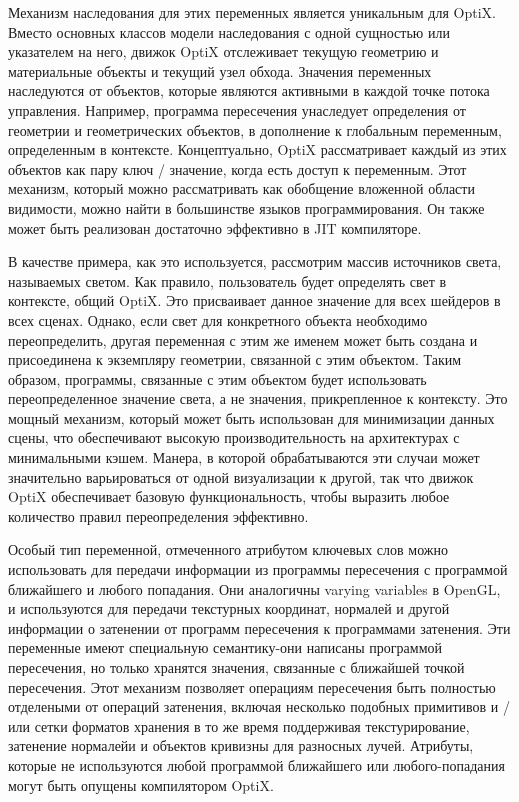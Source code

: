 Механизм наследования для этих переменных является уникальным для OptiX.
Вместо основных классов модели наследования с одной сущностью или указателем на него, движок OptiX отслеживает текущую геометрию и материальные объекты и текущий узел обхода.
Значения переменных наследуются от объектов, которые являются активными в каждой точке потока управления.
Например, программа пересечения унаследует определения от геометрии и геометрических объектов, в дополнение к глобальным переменным, определенным в контексте.
Концептуально, OptiX рассматривает каждый из этих объектов как пару ключ / значение, когда есть доступ к переменным.
Этот механизм, который можно рассматривать как обобщение вложенной области видимости, можно найти в большинстве языков программирования. Он также может быть реализован достаточно эффективно в JIT компиляторе.

В качестве примера, как это используется, рассмотрим массив источников света, называемых светом.
Как правило, пользователь будет определять свет в контексте, общий OptiX.
Это присваивает данное значение для всех шейдеров в всех сценах.
Однако, если свет для конкретного объекта необходимо переопределить, другая переменная с этим же именем может быть создана и присоединена к экземпляру геометрии, связанной с этим объектом.
Таким образом, программы, связанные с этим объектом будет использовать переопределенное значение света, а не значения, прикрепленное к контексту.
Это мощный механизм, который может быть использован для минимизации данных сцены, что обеспечивают высокую производительность на архитектурах с минимальными кэшем.
Манера, в которой обрабатываются эти случаи может значительно варьироваться от одной визуализации к другой, так что движок OptiX обеспечивает базовую функциональность, чтобы выразить любое количество правил переопределения эффективно.

Особый тип переменной, отмеченного атрибутом ключевых слов можно использовать для передачи информации из программы пересечения с программой ближайшего и любого попадания.
Они аналогичны varying variables в OpenGL, и используются для передачи текстурных координат, нормалей и другой информации о затенении от программ пересечения к программами затенения.
Эти переменные имеют специальную семантику-они написаны программой пересечения, но только хранятся значения, связанные с ближайшей точкой пересечения.
Этот механизм позволяет операциям пересечения быть полностью отделеными от операций затенения, включая несколько подобных примитивов и / или сетки форматов хранения в то же время поддерживая текстурирование, затенение нормалейи и объектов кривизны для разносных лучей.
Атрибуты, которые не используются любой программой ближайшего или любого-попадания могут быть опущены компилятором OptiX.

